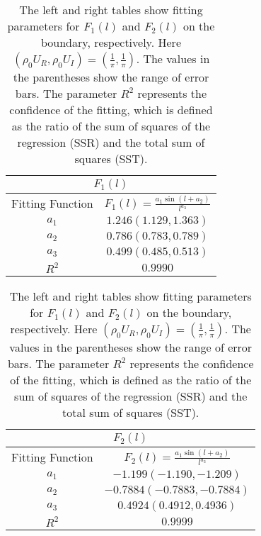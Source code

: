 \documentclass[aps,prl,twocolumn,superscriptaddress]{revtex4-1}
\begin{document}
\begin{bibunit}
\begin{table}
	\begin{tabular}{|c|c|}
		\hline 
		\multicolumn{2}{|c|}{$F_{1}(l)$}\tabularnewline
		\hline
		\hline 
		Fitting Function & $F_1(l)=\frac{a_{1}\sin(l+a_{2})}{l^{a_{3}}}$\tabularnewline
		\hline 
		$a_{1}$ & $1.246(1.129,1.363)$\tabularnewline
		\hline 
		$a_{2}$ & $0.786(0.783,0.789)$\tabularnewline
		\hline 
		$a_{3}$ & $0.499(0.485,0.513)$\tabularnewline
		\hline 
		$R^{2}$ & $0.9990$\tabularnewline
		\hline 
	\end{tabular}%
	\begin{tabular}{|c|c|}
		\hline 
		\multicolumn{2}{|c|}{$F_{2}(l)$}\tabularnewline
		\hline 
		\hline
		Fitting Function & $F_{2}(l)=\frac{a_{1}\sin(l+a_{2})}{l^{a_{3}}}$\tabularnewline
		\hline 
		$a_{1}$ & $-1.199(-1.190,-1.209)$\tabularnewline
		\hline 
		$a_{2}$ & $-0.7884(-0.7883,-0.7884)$\tabularnewline
		\hline 
		$a_{3}$ & $0.4924(0.4912,0.4936)$\tabularnewline
		\hline 
		$R^{2}$ & $0.9999$\tabularnewline
		\hline 
	\end{tabular}
	
	\caption{The left and right tables show fitting parameters for $F_1(l)$ and $F_2(l)$ on the boundary, respectively. Here $(\rho_{0}U_{R},\rho_{0}U_{I})=(\frac{1}{\pi},\frac{1}{\pi})$. The values in the parentheses show the range of error bars. The parameter $R^2$ represents the confidence of the fitting, which is defined as the ratio of the sum of squares of the regression (SSR) and the total sum of squares (SST).}
	

\end{table}
\end{bibunit}
\end{document}

